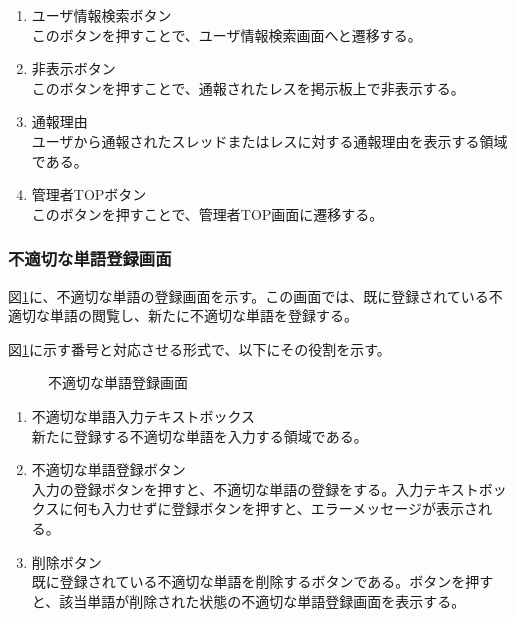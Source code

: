\documentclass[a4j]{jarticle}
\begin{document}
\begin{enumerate}
  \renewcommand{\labelenumi}{\textcircled{\scriptsize \theenumi}}

\item ユーザ情報検索ボタン\\
このボタンを押すことで、ユーザ情報検索画面へと遷移する。
\item 非表示ボタン\\
このボタンを押すことで、通報されたレスを掲示板上で非表示する。
\item 通報理由\\
ユーザから通報されたスレッドまたはレスに対する通報理由を表示する領域である。
\item 管理者TOPボタン\\
このボタンを押すことで、管理者TOP画面に遷移する。

\end{enumerate}

\subsubsection{不適切な単語登録画面}
図\ref{fig:NGword}に、不適切な単語の登録画面を示す。この画面では、既に登録されている不適切な単語の閲覧し、新たに不適切な単語を登録する。

図\ref{fig:NGword}に示す番号と対応させる形式で、以下にその役割を示す。
\begin{figure}[H]
\centering
{}
\caption{不適切な単語登録画面}
\label{fig:NGword}
\end{figure}
\begin{enumerate}
  \renewcommand{\labelenumi}{\textcircled{\scriptsize \theenumi}}
  \item 不適切な単語入力テキストボックス\\
  新たに登録する不適切な単語を入力する領域である。
  \item 不適切な単語登録ボタン\\
  入力の登録ボタンを押すと、不適切な単語の登録をする。入力テキストボックスに何も入力せずに登録ボタンを押すと、エラーメッセージが表示される。
  \item 削除ボタン\\
  既に登録されている不適切な単語を削除するボタンである。ボタンを押すと、該当単語が削除された状態の不適切な単語登録画面を表示する。
\end{enumerate}
\end{document}
